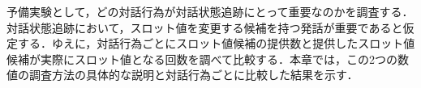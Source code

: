 予備実験として，どの対話行為が対話状態追跡にとって重要なのかを調査する．対話状態追跡において，スロット値を変更する候補を持つ発話が重要であると仮定する．ゆえに，対話行為ごとにスロット値候補の提供数と提供したスロット値候補が実際にスロット値となる回数を調べて比較する．本章では，この2つの数値の調査方法の具体的な説明と対話行為ごとに比較した結果を示す．
